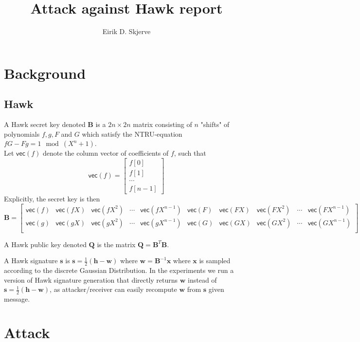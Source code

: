 \documentclass[12 pt]{article}        	%
\newcommand{\mat}[1]{\mathbf{#1}}
\renewcommand{\vec}[1]{\mathbf{#1}}
\begin{document}
\title{Attack against Hawk report}
\author{Eirik D. Skjerve}
\maketitle
\section{Background}
\subsection{Hawk}
A Hawk secret key denoted $\mat{B}$ is a $2n \times 2n$ matrix consisting of $n$ "shifts" of polynomials $f, g, F$ and $G$ which satisfy the NTRU-equation $fG - Fg = 1 \mod (X^n +1)$. \\
Let $\mathsf{vec}(f)$ denote the column vector of coefficients of $f$, such that 
\[
 \mathsf{vec}(f) = 
    \begin{bmatrix}
        f[0] \\
        f[1] \\
        \cdots \\
        f[n-1]
    \end{bmatrix}
\]
Explicitly, the secret key is then  
\[
    \mat{B} = 
    \begin{bmatrix}
        \mathsf{vec}(f) & \mathsf{vec}(fX) & \mathsf{vec}(fX^2) & \cdots & \mathsf{vec}(fX^{n-1}) & \mathsf{vec}(F) & \mathsf{vec}(FX) & \mathsf{vec}(FX^2) & \cdots & \mathsf{vec}(FX^{n-1}) \\
        \mathsf{vec}(g) & \mathsf{vec}(gX) & \mathsf{vec}(gX^2) & \cdots & \mathsf{vec}(gX^{n-1}) & \mathsf{vec}(G) & \mathsf{vec}(GX) & \mathsf{vec}(GX^2) & \cdots & \mathsf{vec}(GX^{n-1}) \\

    \end{bmatrix}
\]

A Hawk public key denoted $\mat{Q}$ is the matrix $\mat{Q} = \mat{B}^T\mat{B}$.

A Hawk signature $\vec{s}$ is $\vec{s} = \frac{1}{2}(\vec{h} - \vec{w})$ where $\vec{w} = \mat{B}^{-1} \vec{x}$ where $\vec{x}$ is sampled according to the discrete Gaussian Distribution.
In the experiments we run a version of Hawk signature generation that directly returns $\vec{w}$ instead of $\vec{s} = \frac{1}{2}(\vec{h} - \vec{w})$, as attacker/receiver can easily recompute $\vec{w}$ from $\vec{s}$ given message.

\section{Attack}
\end{document}
